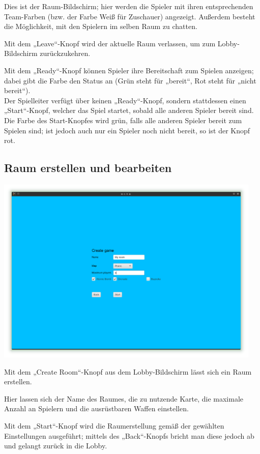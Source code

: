 \documentclass{scrreprt}
\begin{document}
Dies ist der Raum-Bildschirm; hier werden die Spieler mit ihren entsprechenden Team-Farben (bzw. der Farbe Weiß für
Zuschauer) angezeigt. Außerdem besteht die Möglichkeit, mit den Spielern im selben Raum zu chatten.

Mit dem „Leave“-Knopf wird der aktuelle Raum verlassen, um zum Lobby-Bildschirm zurückzukehren.

Mit dem „Ready“-Knopf können Spieler ihre Bereitschaft zum Spielen anzeigen; dabei gibt die Farbe den Status an (Grün steht für „bereit“,
Rot steht für „nicht bereit“).\\
Der Spielleiter verfügt über keinen „Ready“-Knopf, sondern stattdessen einen „Start“-Knopf, welcher das Spiel startet, sobald alle anderen Spieler bereit sind. Die Farbe des Start-Knopfes wird grün, falls alle anderen Spieler bereit zum Spielen sind; ist jedoch auch nur ein Spieler noch nicht bereit, so ist der Knopf rot.

\subsection{Raum erstellen und bearbeiten}
\label{Raum} 

\includegraphics[height=9cm]{Screenshot14.png}

Mit dem „Create Room“-Knopf aus dem Lobby-Bildschirm lässt sich ein Raum erstellen.

Hier lassen sich der Name des Raumes, die zu nutzende Karte, die maximale Anzahl an Spielern und die ausrüstbaren Waffen einstellen.

Mit dem „Start“-Knopf wird die Raumerstellung gemäß der gewählten Einstellungen ausgeführt; mittels des „Back“-Knopfs bricht man diese jedoch ab und gelangt zurück in die Lobby.
\end{document}
